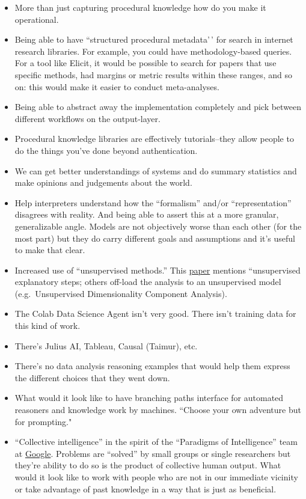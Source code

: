 \documentclass[
]{article}
\begin{document}
\begin{itemize}
\item
  More than just capturing procedural knowledge how do you make it
  operational.
\item
  Being able to have ``structured procedural metadata'\,' for search in
  internet research libraries. For example, you could have
  methodology-based queries. For a tool like Elicit, it would be
  possible to search for papers that use specific methods, had margins
  or metric results within these ranges, and so on: this would make it
  easier to conduct meta-analyses.
\item
  Being able to abstract away the implementation completely and pick
  between different workflows on the output-layer.
\item
  Procedural knowledge libraries are effectively tutorials--they allow
  people to do the things you've done beyond authentication.
\item
  We can get better understandings of systems and do summary statistics
  and make opinions and judgements about the world.
\item
  Help interpreters understand how the ``formalism'' and/or
  ``representation'' disagrees with reality. And being able to assert
  this at a more granular, generalizable angle. Models are not
  objectively worse than each other (for the most part) but they do
  carry different goals and assumptions and it's useful to make that
  clear.
\item
  Increased use of ``unsupervised methods.'' This
  \href{https://arxiv.org/pdf/2111.15506}{paper} mentions ``unsupervised
  explanatory steps; others off-load the analysis to an unsupervised
  model (e.g.~Unsupervised Dimensionality Component Analysis).
\item
  The Colab Data Science Agent isn't very good. There isn't training
  data for this kind of work.
\item
  There's Julius AI, Tableau, Causal (Taimur), etc.
\item
  There's no data analysis reasoning examples that would help them
  express the different choices that they went down.
\item
  What would it look like to have branching paths interface for
  automated reasoners and knowledge work by machines. ``Choose your own
  adventure but for prompting."
\item
  ``Collective intelligence'' in the spirit of the ``Paradigms of
  Intelligence'' team at
  \href{https://www.theatlantic.com/sponsored/google/beyond-the-brain/3944/}{Google}.
  Problems are ``solved'' by small groups or single researchers but
  they're ability to do so is the product of collective human output.
  {What would it look like to work with people who are not in our
  immediate vicinity or take advantage of past knowledge in a way that
  is just as beneficial.}


\end{itemize}
\end{document}

